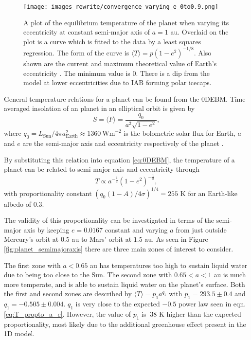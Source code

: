 \documentclass[12pt, onecolumn]{revtex4-2}    %
\begin{document}
\begin{figure}[t]
  \texttt{[image: images\_rewrite/convergence\_varying\_e\_0to0.9.png]}
  \caption{
    A plot of the equilibrium temperature of the planet when varying its eccentricity at constant semi-major axis of $a = 1$ au.
    Overlaid on the plot is a curve which is fitted to the data by a least squares regression.
    The form of the curve is $\langle T \rangle = p(1-e^2)^{-1/8}$.
    Also shown are the current and maximum theoretical value of Earth's eccentricity \cite{LA2010}.
    The minimum value is $0$.
    There is a dip from the model at lower eccentricities due to IAB forming polar icecaps.
  }
  \label{fig:planet_eccentricity}
\end{figure}

General temperature relations for a planet can be found from the 0DEBM.
Time averaged insolation of an planet in an elliptical orbit is given by
\begin{equation}
  S = \langle F \rangle = \frac{q_0}{a^2 \sqrt{1-e^2}},
  \label{eq:avgInsolation}
\end{equation}
where $q_0 = L_{\text{Sun}}/4\pi a_{\text{Earth}}^2 \approx 1360 \ \text{Wm}^{-2}$ is the bolometric solar flux for Earth, $a$ and $e$ are the semi-major axis and eccentricity respectively of the planet \cite{Mendez2017}.

By substituting this relation into equation \eqref{eq:0DEBM}, the temperature of a planet can be related to semi-major axis and eccentricity through
\begin{equation}
  T \propto a^{-\frac{1}{2}} (1-e^2)^{-\frac{1}{8}}, 
  \label{eq:T_propto_a_e}
\end{equation}
with proportionality constant $(q_0 (1-A) / 4\sigma)^{1/4} = 255$ K for an Earth-like albedo of 0.3.


The validity of this proportionality can be investigated in terms of the semi-major axis by keeping $e = 0.0167$ constant and varying $a$ from just outside Mercury's orbit at $0.5$ au to Mars' orbit at $1.5$ au.
As seen in Figure \ref{fig:planet_semimajoraxis} there are three main zones of interest to consider.

The first zone with $a < 0.65$ au has temperatures too high to sustain liquid water due to being too close to the Sun.
The second zone with $0.65 < a < 1$ au is much more temperate, and is able to sustain liquid water on the planet's surface.
Both the first and second zones are described by $\langle T \rangle = p_1 a^{q_1}$ with $p_1 = 293.5 \pm 0.4$ and $q_1= -0.505 \pm 0.004$. $q_1$ is very close to the expected $-0.5$ power law seen in eqn. \eqref{eq:T_propto_a_e}.
However, the value of $p_1$ is $~38$ K higher than the expected proportionality, most likely due to the additional greenhouse effect present in the 1D model.
\end{document}
